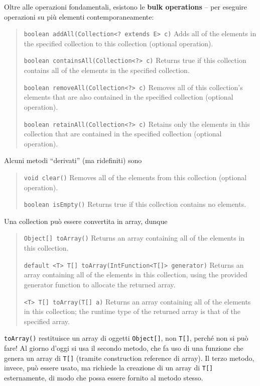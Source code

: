 \documentclass[\fontsizeclass,twocolumn]{\classname}
\theoremstyle{definition}
\theoremstyle{definition}
\begin{document}
Oltre alle operazioni fondamentali, esistono le \textbf{bulk operations} -- per
eseguire operazioni su più elementi contemporaneamente:

\begin{quote}
    \footnotesize{\texttt{boolean	addAll(Collection<? extends E> c)}	Adds all of the elements in the specified collection to this collection (optional operation).

\texttt{boolean	containsAll(Collection<?> c)}	Returns true if this collection contains all of the elements in the specified collection.

\texttt{boolean	removeAll(Collection<?> c)}	Removes all of this collection's elements that are also contained in the specified collection (optional operation).

\texttt{boolean	retainAll(Collection<?> c)}	Retains only the elements in this collection that are contained in the specified collection (optional operation).
}
\end{quote}

Alcuni metodi ``derivati'' (ma ridefiniti) sono
\begin{quote}
    \footnotesize{\texttt{void	clear()}	Removes all of the elements from this collection (optional operation).

\texttt{boolean	isEmpty()}	Returns true if this collection contains no elements.}
\end{quote}

Una collection può essere convertita in array, dunque
\begin{quote}
    \footnotesize{\texttt{Object[]	toArray()}	Returns an array containing all of the elements in this collection.

\texttt{default <T> T[]	toArray(IntFunction<T[]> generator)}	Returns an array containing all of the elements in this collection, using the provided generator function to allocate the returned array.

\texttt{<T> T[]	toArray(T[] a)}	Returns an array containing all of the elements in this collection; the runtime type of the returned array is that of the specified array.}
\end{quote}

\texttt{toArray()} restituisce un array di oggetti \texttt{Object[]}, non
\texttt{T[]}, perché non si può fare! Al giorno d'oggi si usa il secondo
metodo, che fa uso di una funzione che genera un array di \texttt{T[]} (tramite
construction reference di array). Il terzo metodo, invece, può essere usato, ma
richiede la creazione di un array di \texttt{T[]} esternamente, di modo che
possa essere fornito al metodo stesso.
\end{document}

